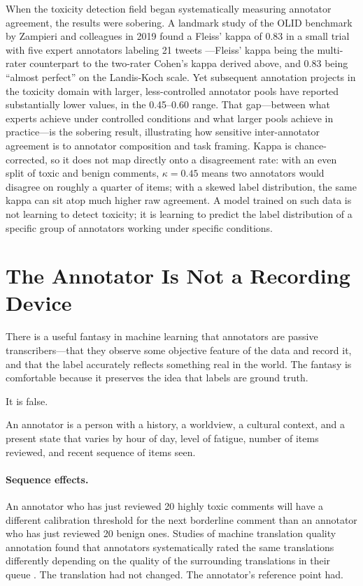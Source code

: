 When the toxicity detection field began systematically measuring annotator agreement, the results were sobering. A landmark study of the OLID benchmark by Zampieri and colleagues in 2019 found a Fleiss' kappa of 0.83 in a small trial with five expert annotators labeling 21 tweets \autocite{zampieri2019predicting}---Fleiss' kappa being the multi-rater counterpart to the two-rater Cohen's kappa derived above, and 0.83 being ``almost perfect'' on the Landis-Koch scale. Yet subsequent annotation projects in the toxicity domain with larger, less-controlled annotator pools have reported substantially lower values, in the 0.45--0.60 range. That gap---between what experts achieve under controlled conditions and what larger pools achieve in practice---is the sobering result, illustrating how sensitive inter-annotator agreement is to annotator composition and task framing. Kappa is chance-corrected, so it does not map directly onto a disagreement rate: with an even split of toxic and benign comments, $\kappa = 0.45$ means two annotators would disagree on roughly a quarter of items; with a skewed label distribution, the same kappa can sit atop much higher raw agreement. A model trained on such data is not learning to detect toxicity; it is learning to predict the label distribution of a specific group of annotators working under specific conditions.

\section{The Annotator Is Not a Recording Device}
\label{sec:ch7-annotator-bias}

There is a useful fantasy in machine learning that annotators are passive transcribers---that they observe some objective feature of the data and record it, and that the label accurately reflects something real in the world. The fantasy is comfortable because it preserves the idea that labels are ground truth.

It is false.

An annotator is a person with a history, a worldview, a cultural context, and a present state that varies by hour of day, level of fatigue, number of items reviewed, and recent sequence of items seen.

\paragraph{Sequence effects.} An annotator who has just reviewed 20 highly toxic comments will have a different calibration threshold for the next borderline comment than an annotator who has just reviewed 20 benign ones. Studies of machine translation quality annotation found that annotators systematically rated the same translations differently depending on the quality of the surrounding translations in their queue \autocite{mathur2017sequence}. The translation had not changed. The annotator's reference point had.

